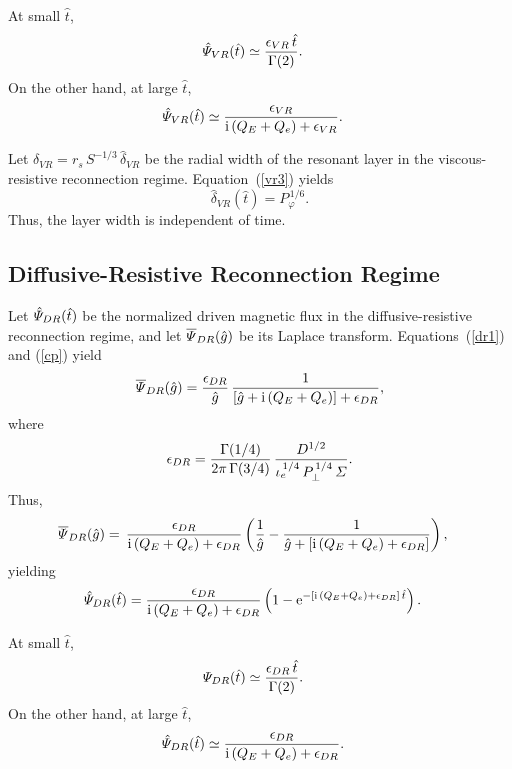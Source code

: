 \documentclass[12pt,prb,aps]{revtex4-1}
\begin{document}
At small $\hat{t}$,
\begin{align}\label{vrs}
\hat{\mit\Psi}_{VR}(\hat{t}) &\simeq \frac{\epsilon_{VR}\,\hat{t}}{\Gamma(2)}.
\end{align}
On the other hand, at large $\hat{t}$, 
\begin{align}\label{vrl}
\hat{\mit\Psi}_{VR}(\hat{t}) &\simeq 
\frac{\epsilon_{VR}}{{\rm i}\,(Q_E+Q_e)+\epsilon_{VR}}.
\end{align}

Let $\delta_{VR} =r_s\,S^{-1/3}\,\hat{\delta}_{VR}$ be the radial width of the resonant layer in the viscous-resistive reconnection regime. 
Equation~(\ref{vr3}) yields
\begin{equation}
\hat{\delta}_{VR}(\hat{t}) = P_\varphi^{\,1/6}.
\end{equation}
Thus, the layer width is independent of time. 

\subsection{Diffusive-Resistive Reconnection Regime}\label{diffusive}
Let $\hat{\mit\Psi}_{DR}(\hat{t})$ be the normalized driven magnetic flux in the diffusive-resistive reconnection regime, and let $\overline{\mit\Psi}_{DR}(\hat{g})$ be its Laplace transform.
 Equations~(\ref{dr1}) and (\ref{cp}) yield 
 \begin{equation}
\overline{\mit\Psi}_{DR}(\hat{g}) =\frac{\epsilon_{DR}}{\hat{g}}\,\frac{1}
{[\hat{g}+ {\rm i}\,(Q_E+Q_e)]+\epsilon_{DR}},
\end{equation}
where
\begin{equation}
\epsilon_{DR} = \frac{\Gamma(1/4)}{2\pi\,\Gamma(3/4)}\,\frac{D^{1/2}}{\iota_e^{\,1/4}\,P_\perp^{\,1/4}\,{\mit\Sigma}}.
\end{equation}
Thus,
\begin{align}
\overline{\mit\Psi}_{DR}(\hat{g}) &=
\,\frac{\epsilon_{DR}}{{\rm i}\,(Q_E+Q_e)+\epsilon_{DR}}\left(\frac{1}{\hat{g}} - \frac{1}{\hat{g} + [{\rm i}\,(Q_E+Q_e)+\epsilon_{DR}]}\right),
\end{align}
yielding 
\begin{align}\label{drp}
\hat{\mit\Psi}_{DR}(\hat{t}) &=
\frac{\epsilon_{DR}}{{\rm i}\,(Q_E+Q_e)+\epsilon_{DR}}\left(1 - {\rm e}^{- [{\rm i}\,(Q_E+Q_e)+\epsilon_{DR}]\,\hat{t}}\right).
\end{align}

At small $\hat{t}$,
\begin{align}\label{drs}
{\mit\Psi}_{DR}(\hat{t}) &\simeq\frac{\epsilon_{DR}\,\hat{t}}{\Gamma(2)}.
\end{align}
On the other hand, at large $\hat{t}$, 
\begin{align}\label{drl}
\hat{\mit\Psi}_{DR}(\hat{t}) &\simeq 
\frac{\epsilon_{DR}}{{\rm i}\,(Q_E+Q_e)+\epsilon_{DR}}.
\end{align}
\end{document}
